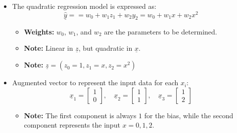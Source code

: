     \begin{example}
        \begin{itemize}
                \item The quadratic regression model is expressed as:
                \[
                \underline{\hat{y}} = = w_0 + w_1 z_1 + w_2 y_2 = w_0 + w_1 x + w_2 x^2 
                \]
                \begin{itemize}
                    \item \textbf{Weights:} \( w_0 \), \( w_1 \), and \( w_2 \) are the parameters to be determined.
                    \item \textbf{Note:} Linear in $\underline{z}$, but quadratic in $\underline{x}$.
                    \item \textbf{Note:} $\underline{z}=(z_0 = 1, z_1=x, z_2 = x^2)$
                \end{itemize}
                
                \item Augmented vector to represent the input data for each \( x_i \):
                \[
                \underline{x}_1 = \begin{bmatrix} 1 \\ 0 \end{bmatrix}, \quad 
                \underline{x}_2 = \begin{bmatrix} 1 \\ 1 \end{bmatrix}, \quad 
                \underline{x}_3 = \begin{bmatrix} 1 \\ 2 \end{bmatrix}
                \]
                \begin{itemize}
                    \item \textbf{Note:} The first component is always $1$ for the bias, while the second component represents the input $x=0,1,2$.
                \end{itemize}
                \vspace{1em}
                

\end{itemize}
\end{example}
